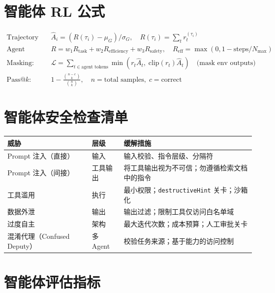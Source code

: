 \section{智能体 RL 公式}
\label{agentic-rl-formulas}

\begin{align}
\text{Trajectory GRPO:}&\quad \hat{A}_i = (R(\tau_i) - \mu_G)/\sigma_G, \quad R(\tau_i) = \sum_{t} r_t^{(\tau_i)} \\
\text{Agent reward:}&\quad R = w_1 R_\text{task} + w_2 R_\text{efficiency} + w_3 R_\text{safety}, \quad R_\text{eff} = \max(0, 1 - \text{steps}/N_\text{max}) \\
\text{Masking:}&\quad \mathcal{L} = \sum_{t \in \text{agent tokens}} \min(r_t \hat{A}_t,\; \text{clip}(r_t) \hat{A}_t) \quad \text{(mask env outputs)} \\
\text{Pass@}k:&\quad 1 - \frac{\binom{n-c}{k}}{\binom{n}{k}}, \quad n = \text{total samples},\; c = \text{correct}
\end{align}

\section{智能体安全检查清单}
\label{agent-security-checklist}

\noindent\begin{tabularx}{\linewidth}{@{}l Z{0.3} Z{1.7}@{}}
\toprule
\textbf{威胁} & \textbf{层级} & \textbf{缓解措施} \\
\midrule
Prompt 注入（直接） & 输入 & 输入校验、指令层级、分隔符 \\
Prompt 注入（间接） & 工具输出 & 将工具输出视为不可信；勿遵循检索文档中的指令 \\
工具滥用 & 执行 & 最小权限；\texttt{destructiveHint} 关卡；沙箱化 \\
数据外泄 & 输出 & 输出过滤；限制工具仅访问白名单域 \\
过度自主 & 架构 & 最大迭代次数；成本预算；人工审批关卡 \\
混淆代理（Confused Deputy） & 多 Agent & 校验任务来源；基于能力的访问控制 \\
\bottomrule
\end{tabularx}

\section{智能体评估指标}
\label{agent-evaluation-metrics}

